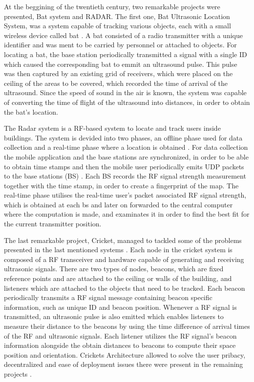 \documentclass[a4paper]{IEEEtran}
\begin{document}
At the beggining of the twentieth century, two remarkable projects were presented, Bat system \cite{bat} and RADAR\cite{radar}. The first one, Bat Ultrasonic Location System, was a system capable of tracking various objects, each with a small wireless device called bat \cite{bat1, bat2}. A bat consisted of a radio transmitter with a unique identifier and was ment to be carried by personnel or attached to objects. For locating a bat, the base station periodically transmitted a signal with a single ID which caused the corresponding bat to emmit an ultrasound pulse. This pulse was then captured by an existing grid of receivers, which were placed on the ceiling of the areas to be covered, which recorded the time of arrival of the ultrasound. Since the speed of sound in the air is known, the system was capable of converting the time of flight of the ultrasound into distances, in order to obtain the bat's location.

The Radar system is a RF-based system to locate and track users inside buildings. The system is devided into two phases, an offline phase used for data collection and a real-time phase where a location is obtained \cite{radar1}. For data collection the mobile application and the base stations are synchronized, in order to be able to obtain time stamps and then the mobile user periodically emits UDP packets to the base stations (BS) . Each BS records the RF signal strength measurement together with the time stamp, in order to create a fingerprint of the map.  The real-time phase utilises the real-time user's packet associated RF signal strength, which is obtained at each bs and later on forwarded to the central computer where the computation is made, and examinates it in order to find the best fit for the current transmitter position.

The last remarkable project, Cricket, managed to tackled some of the problems presented in the last mentioned systems \cite{cricket1}. Each node in the cricket system is composed of a RF transceiver and hardware capable of generating and receiving ultrasonic signals. There are two types of nodes, beacons, which are fixed reference points and are attached to the ceiling or walls of the building, and listeners which are attached to the objects that need to be tracked. Each beacon periodically transmits a RF signal message containing beacon specific information, such as unique ID and beacon position. Whenever a RF signal is transmitted, an ultrasonic pulse is also emitted which enables listeners to measure their distance to the beacons by using the time difference of arrival times of the RF and ultrasonic signals. Each listener utilizes the RF signal's beacon information alongside the obtain distances to beacons to compute their space position and orientation. Crickets Architecture allowed to solve the user pribacy, decentralized and ease of deployment issues there were present in the remaining projects \cite{cricket}.
\end{document}
